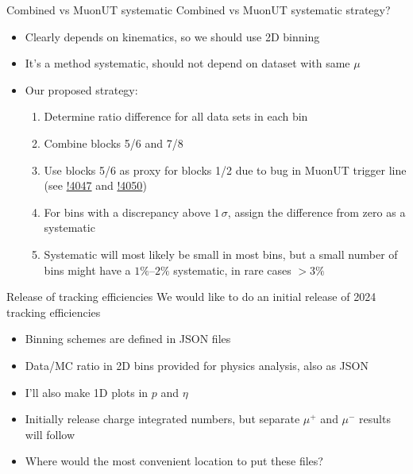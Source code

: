 \documentclass[xcolor={dvipsnames}]{beamer}
\begin{document}
\begin{frame}{Combined vs MuonUT systematic}
  \vspace{0.0cm}
  {\large Combined vs MuonUT systematic strategy?}
  \begin{itemize}
    \setlength\itemsep{1.0em}
    \item{Clearly depends on kinematics, so we should use 2D binning}
    \item{It's a method systematic, should not depend on dataset with same $\mu$}
    \item{Our proposed strategy:}
    \begin{enumerate}
      \setlength\itemsep{0.5em}
      \item{Determine ratio difference for all data sets in each bin}
      \item{Combine blocks 5/6 and 7/8}
      \item{Use blocks 5/6 as proxy for blocks 1/2 due to bug in MuonUT trigger line (see \href{https://gitlab.cern.ch/lhcb/Rec/-/merge_requests/4047}{!4047} and \href{https://gitlab.cern.ch/lhcb/Rec/-/merge_requests/4050}{!4050})}
      \item{For bins with a discrepancy above $1\,\sigma$, assign the difference from zero as a systematic}
      \item{Systematic will most likely be small in most bins, but a small number of bins might have a $1\%$--$2\%$ systematic, in rare cases $> 3\%$}
    \end{enumerate}
  \end{itemize}
\end{frame}

\begin{frame}{Release of tracking efficiencies}
  \vspace{0.0cm}
  {\large We would like to do an initial release of 2024 tracking efficiencies}
  \begin{itemize}
    \setlength\itemsep{1.0em}
    \item{Binning schemes are defined in JSON files}
    \item{Data/MC ratio in 2D bins provided for physics analysis, also as JSON}
    \item{I'll also make 1D plots in $p$ and $\eta$}
    \item{Initially release charge integrated numbers, but separate $\mu^+$ and $\mu^-$ results will follow}
    \item{Where would the most convenient location to put these files?}
  \end{itemize}
\end{frame}
\end{document}

